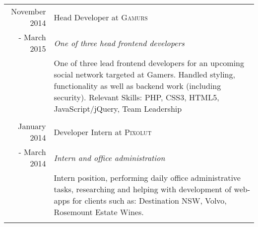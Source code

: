 \documentclass[10pt]{article}
\begin{document}
\begin{tabular}{r|p{11cm}}
November 2014 & Head Developer at \textsc{Gamurs} \\ - March 2015 & \emph{One of three head frontend developers} \\& \footnotesize{One of three lead frontend developers for an upcoming social network targeted at Gamers. Handled styling, functionality as well as backend work (including security). Relevant Skills: PHP, CSS3, HTML5, JavaScript/jQuery, Team Leadership} \\ \multicolumn{2}{c}{} \\
January 2014 & Developer Intern at \textsc{Pixolut} \\ - March 2014 & \emph{Intern and office administration}\\ & \footnotesize{Intern position, performing daily office administrative tasks, researching and helping with development of web-apps for clients such as: Destination NSW, Volvo, Rosemount Estate Wines.}\\\multicolumn{2}{c}{}\\
\end{tabular} 
\newpage
\end{document}
